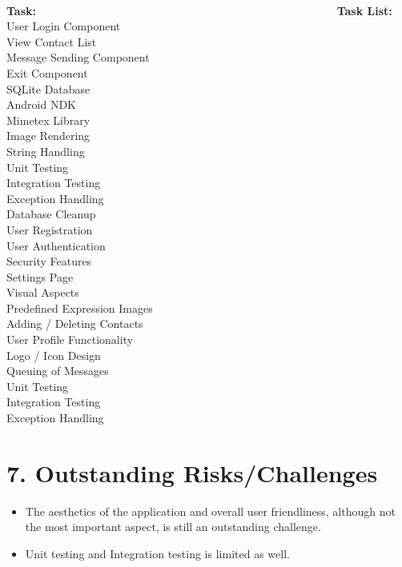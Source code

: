 \documentclass[29pt,a4paper]{moderncv}
\begin{document}
\newpage
\begin{tabbing}
\\\textbf{Task:} ~~~~~~~~~~~~~~~~~~~~~~~~~~~~~~~~~~~~~~~~~~~~~~~~~~~~~\= \textbf{Task List:}\\

User Login Component \\
View Contact List	  \\
Message Sending Component \\
Exit Component	 \\
SQLite Database	 \\
Android NDK	 \\
Mimetex Library	 \\
Image Rendering	 \\
String Handling \\
Unit Testing	 \\
Integration Testing	 \\
Exception Handling \\
Database Cleanup	 \\
User Registration	\\
User Authentication	 \\
Security Features	 \\
Settings Page \\
Visual Aspects	 \\
Predefined Expression Images \\
Adding / Deleting Contacts \\
User Profile Functionality \\
Logo / Icon Design \\
Queuing of Messages \\
Unit Testing	 \\
Integration Testing	 \\
Exception Handling	 \\

\end{tabbing}

\newpage
		\section*{7. Outstanding Risks/Challenges}
		\begin{itemize}
			\item The aesthetics of the application and overall user friendliness, although not the most important aspect, is still an outstanding challenge.
			\item Unit testing and Integration testing is limited as well.
		\end{itemize}
\newpage		
\end{document}
